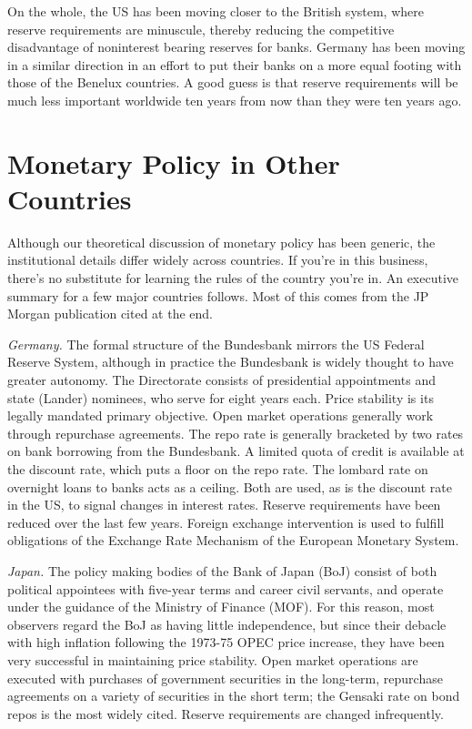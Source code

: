 \documentclass[letterpaper,12pt]{article}
\begin{document}
     On the whole, the US has been moving closer to the British system, where
reserve requirements are minuscule, thereby reducing the competitive disadvantage of noninterest
bearing reserves for banks.  Germany has been moving in a similar direction in an effort to put
their banks on a more equal footing with those of the Benelux countries.  A good guess is that
reserve requirements will be much less important worldwide ten years from now than they were ten
years ago.


\section{Monetary Policy in Other Countries}

     Although our theoretical discussion of monetary policy has been generic,
the institutional details differ widely across countries.  If you're in this business, there's no
substitute for learning the rules of the country you're in.  An executive summary for a few major
countries follows.  Most of this comes from the JP Morgan publication cited at the end.

     {\em Germany.}
The formal structure of the Bundesbank mirrors the US Federal Reserve System, although in practice
the Bundesbank is widely thought to have greater autonomy.  The Directorate consists of
presidential appointments and state (Lander) nominees, who serve for eight years each.  Price
stability is its legally mandated primary objective.  Open market operations generally work
through repurchase agreements.  The repo rate is generally bracketed by two rates on bank
borrowing from the Bundesbank.  A limited quota of credit is available at the discount rate, which
puts a floor on the repo rate.  The lombard rate on overnight loans to banks acts as a ceiling.
Both are used, as is the discount rate in the US, to signal changes in interest rates. Reserve
requirements have been reduced over the last few years.  Foreign exchange intervention is used to
fulfill obligations of the Exchange Rate Mechanism of the European Monetary System.

     {\em Japan.}
The policy making bodies of the Bank of Japan (BoJ) consist of both political appointees with
five-year terms and career civil servants, and operate under the guidance of the Ministry of
Finance (MOF).  For this reason, most observers regard the BoJ as having little independence, but
since their debacle with high inflation following the 1973-75 OPEC price increase, they have been
very successful in maintaining price stability. Open market operations are executed with purchases
of government securities in the long-term, repurchase agreements on a variety of securities in the
short term; the Gensaki rate on bond repos is the most widely cited.  Reserve requirements are
changed infrequently.
\end{document}
